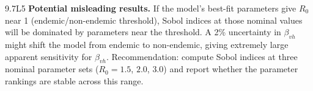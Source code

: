 \begin{solution}{9.7}{L5}
 \textbf{Potential misleading results.}
If the model's best-fit parameters give $R_0$ near 1 (endemic/non-endemic
threshold), Sobol indices at those nominal values will be dominated by
parameters near the threshold. A 2\% uncertainty in $\beta_{vh}$ might
shift the model from endemic to non-endemic, giving extremely large apparent
sensitivity for $\beta_{vh}$. Recommendation: compute Sobol indices at
three nominal parameter sets ($R_0 = 1.5$, $2.0$, $3.0$) and report
whether the parameter rankings are stable across this range.


\end{solution}

